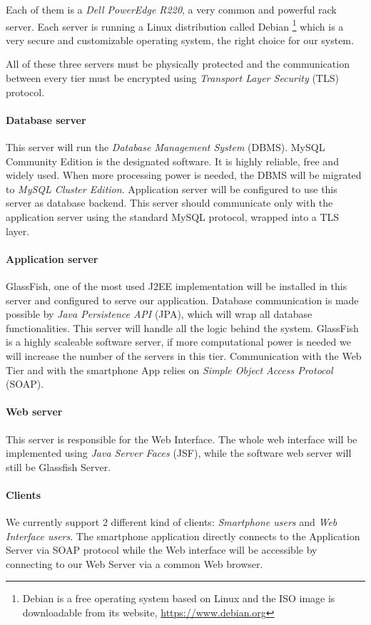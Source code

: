 Each of them is a \emph{Dell PowerEdge R220}\cite{r220}, a very common and 
powerful rack server.
Each server is running a Linux distribution called Debian
\footnote{Debian is a free operating system based on Linux and the ISO image is downloadable from its website, 
\url{https://www.debian.org}}
which is a very secure and customizable operating system, the right choice for our system. 

All of these three servers must be physically protected and the communication between
every tier must be encrypted using \emph{Transport Layer Security} (TLS) protocol.

\paragraph{Database server} This server will run the \emph{Database Management System}
(DBMS).
MySQL Community Edition is the designated software. It is highly reliable, free
and widely used. When more processing power is needed, the DBMS will be 
migrated to \emph{MySQL Cluster Edition}. Application server will be configured 
to use this server as database backend.
This server should communicate only with the application server using the standard
MySQL protocol, wrapped into a TLS layer.

\paragraph{Application server} GlassFish, one of the most used J2EE implementation
will be installed in this server and configured to serve our application.
Database communication is made possible by \emph{Java Persistence API} (JPA), which will wrap all
database functionalities. This server will handle all the logic behind the system.
GlassFish is a highly scaleable software server, if more computational power 
is needed we will increase the number of the servers in this tier.
Communication with the Web Tier and with the smartphone App relies on 
\emph{Simple Object Access Protocol} (SOAP).

\paragraph{Web server} This server is responsible for the Web Interface.
The whole web interface will be implemented using \emph{Java Server Faces} (JSF), while 
the software web server will still be Glassfish Server.

\paragraph{Clients}
We currently support 2 different kind of clients: \emph{Smartphone users} and 
\emph{Web Interface users}.
The smartphone application directly connects to the Application Server via SOAP protocol
while the Web interface will be accessible by connecting to our Web Server via
a common Web browser.

